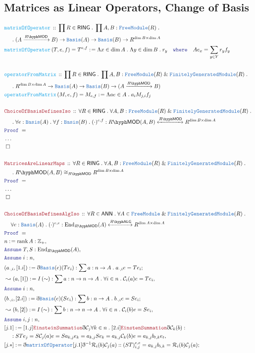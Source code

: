 \documentclass[12pt]{scrartcl}
\newcommand{\TYPE}[1]{\textcolor{NavyBlue}{\mathtt{#1}}}
\newcommand{\FUNC}[1]{\textcolor{Cerulean}{\mathtt{#1}}}
\newcommand{\LOGIC}[1]{\textcolor{Blue}{\mathtt{#1}}}
\newcommand{\THM}[1]{\textcolor{Maroon}{\mathtt{#1}}}
\renewcommand{\.}{\; . \;}
\newcommand{\de}{: \kern 0.1pc =}
\newcommand{\where}{\LOGIC{where}}
\newcommand{\Act}[1]{\left(#1\right)}
\newcommand{\Theorem}[2]{& \THM{#1} \, :: \, #2 \\ & \Proof = \\ }
\newcommand{\DeclareFunc}[2]{& \FUNC{#1} \, :: \, #2 \\}
\newcommand{\DefineNamedFunc}[4]{&  \FUNC{#1}\Act{#2} = #3 \de #4 \\}
\newcommand{\NewLine}{\\ & \kern 1pc}
\newcommand{\Page}[1]{ \begin{align*} #1 \end{align*}   }
\newcommand{ \bd }{ \ByDef }
\newcommand{\NoProof}{ & \ldots \\ \EndProof}
\renewcommand{\And}{\; \& \;}
\newcommand{\Int}{\mathbb{Z} }
\newcommand{\End}{\mathrm{End}}
\newcommand{\Say}[3]{& #1 \de #2 : #3, \\}
\newcommand{\Conclude}[3]{& #1 \de #2 : #3; \\}
\newcommand{\Derive}[3]{& \leadsto #1 \de #2 : #3, \\}
\newcommand{\Assume}[2]{& \LOGIC{Assume} \; #1 : #2, \\}
\newcommand{\QED}{\; \square}
\newcommand{\EndProof}{& \QED \\}
\newcommand{\ByDef}{\eth}
\newcommand{\Proof}{\LOGIC{Proof} \; }
\newcommand{\Arrow}[1]{\xrightarrow{#1}}
\newcommand{\ToIso}[1]{\xleftrightarrow{#1}}
\newcommand{\C}{\mathcal{C}}
\newcommand{\R}{\mathcal{R}}
\DeclareMathOperator{\rank}{rank}
\newcommand{\FGM}{\TYPE{FinitelyGeneratedModule}}
\newcommand{\FM}{\TYPE{FreeModule}}
\newcommand{\LMOD}[1]{#1\hyph\mathsf{MOD}}
\newcommand{\RING}{\mathsf{RING}}
\newcommand{\ANN}{\mathsf{ANN}}
\newcommand{\LALG}[1]{#1\hyph\mathsf{ALG}}
\begin{document}
\subsection{Matrices as Linear Operators, Change of Basis}
\Page{
	\DeclareFunc{matrixOfOperator}{\prod R \in \RING \. \prod A,B : \FM(R) \. \NewLine \. 
		(A \Arrow{\LMOD{R}} B) \to \TYPE{Basis}(A) \to \TYPE{Basis}(B) \to R^{\dim B \times \dim A}  }
	\DefineNamedFunc{matrixOfOperator}{T,e,f}{T^{e,f}}{
		\Lambda x \in \dim A \. \Lambda y \in \dim B \. r_y
		\quad \where \quad Ae_x = \sum_{y \in Y} r_y f_y 
	}
	\\
	\DeclareFunc{operatorFromMatrix}{\prod R \in \RING \. \prod A,B : \FM(R) \And \FGM(R) \. \NewLine \.
		R^{\dim B \times \dim A} \to \TYPE{Basis}(A) \to \TYPE{Basis}(B) \to (A \Arrow{\LMOD{R}} B) 
	}
	\DefineNamedFunc{operatorFromMatrix}{M,e,f}{M_{e,f}}{
		\Lambda  a e \in A  \.  a_i M_{j,i} f_j     
	}
	\\
	\Theorem{ChoiceOfBasisDefinesIso}{
		\forall R \in \RING \.  
		\forall A,B : \FM(R) \And \FGM(R) \. \NewLine \.  
		\forall e : \TYPE{Basis}(A) \. \forall f : \TYPE{Basis}(B) \. 
		(\cdot)^{e,f} : \LMOD{R}(A,B) \ToIso{\LMOD{R}} R^{\dim B \times \dim A} 
	}
	\NoProof
	\\
	\Theorem{MatricesAreLinearMaps}{
		\forall R \in \RING \.  
		\forall A,B : \FM(R) \And \FGM(R) \. \NewLine \.  
		\LMOD{R}(A,B) \cong_{\LMOD{R}} R^{\dim B \times \dim A} 
	}
	\NoProof
	\\
	\Theorem{ChoiceOfBasisDefinesAlgIso}{
		\forall R \in \ANN \.
		\forall A \in \FM \And \FGM(R) \. \NewLine
		\forall e : \TYPE{Basis}(A) \.  (\cdot)^{e,e} : \End_{\LMOD{R}}(A) \ToIso{\LALG{R}} R^{\dim A \times \dim A}
	}
	\Say{n}{\rank A}{\Int_+}
	\Assume{T,S}{ \End_{\LMOD{R}}(A) }
	\Assume{i}{n}
	\Conclude{(a_{\cdot,i},[1.i])}{\bd \TYPE{Basis}(e)(Te_i)}{\sum a : n \to A \. a_{\cdot,i}e = Te_i }
	\Derive{(a,[1])}{I\left(\sim\right)}{\sum a : n \to n \to A \. \forall i \in n \. \C_i(a)e = Te_i}
	\Assume{i}{n}
	\Conclude{(b_{\cdot,i},[2.i])}{\bd \TYPE{Basis}(e)(Se_i)}{\sum b : n \to A \. b_{\cdot,i}e = Se_i }
	\Derive{(b,[2])}{I\left(\sim\right)}{\sum b : n \to n \to A \. \forall i \in n \. \C_{i}(b)e = Se_i}
	\Assume{i,j}{n}
	\Say{[j.1]}{ [1.j] \THM{EinsteinSummation}\bd\C_{j} \forall k \in n \. [2.i] \THM{EinstenSummation}\bd\C_{k}(b)  }{
		\NewLine : 
		STe_j = 
		S\C_{j}(a)e = 
		Sa_{k,j}e_k = a_{k,j}Se_k =
		a_{k,j}\C_k(b)e = a_{k,j}b_{t,k}e_t
	}
	\Conclude{[j.*]}{\bd \TYPE{matrixOfOperator} [j.1]\bd^{-1}\R_i(b)\C_j(a) }{ : (ST)_{i,j}^{e,e} = a_{k,j}b_{i,k} = \R_i(b)\C_j(a)}
}
\end{document}
